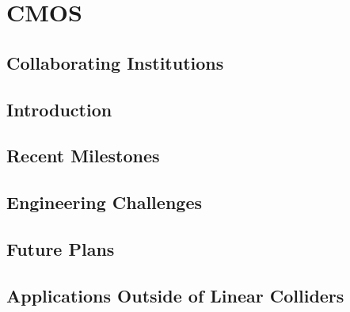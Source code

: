 \section{CMOS}
\subsection{Collaborating Institutions}
\subsection{Introduction}
\subsection{Recent Milestones}
\subsection{Engineering Challenges}
\subsection{Future Plans}
\subsection{Applications Outside of Linear Colliders}
